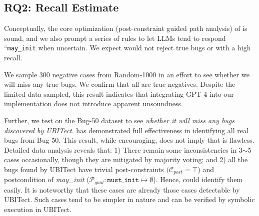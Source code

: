

  

\subsection{RQ2: Recall Estimate}
\label{subsec:expr_recall}

Conceptually, the core optimization (post-constraint guided path analysis) of \work is sound, 
and we also prompt a series of rules to let LLMs tend to respond ``\texttt{may\_init} when uncertain.
We expect \work would not reject true bugs or with a high recall.

We sample 300 negative cases
from Random-1000 in an effort to see whether we will miss any true bugs. 
We confirm that all are true negatives. Despite the limited data sampled, this result indicates that integrating GPT-4 into our implementation does not introduce apparent unsoundness. 

Further, we test \work on the Bug-50 dataset to see \textit{whether it will miss any bugs discovered by UBITect}.
\work has demonstrated full effectiveness in identifying all real bugs from Bug-50. This result, while encouraging, does not imply that \work is flawless. Detailed data analysis reveals that:
1) There remain some inconsistencies in 3\(\sim\)5 cases
occasionally, though they are mitigated by majority voting; and 2) 
all the bugs found by UBITect have trivial post-constraints \((\mathcal{C}_{post}=\top\)) and postcondition of \textit{may\_init} (\(\mathcal{P}_{qual}: \texttt{must\_init} \mapsto \emptyset\)). 
Hence, \work could identify them easily.
It is noteworthy that these cases are already those cases detectable by UBITect. 
Such cases tend to be simpler in nature and can be verified by symbolic execution in UBITect.

